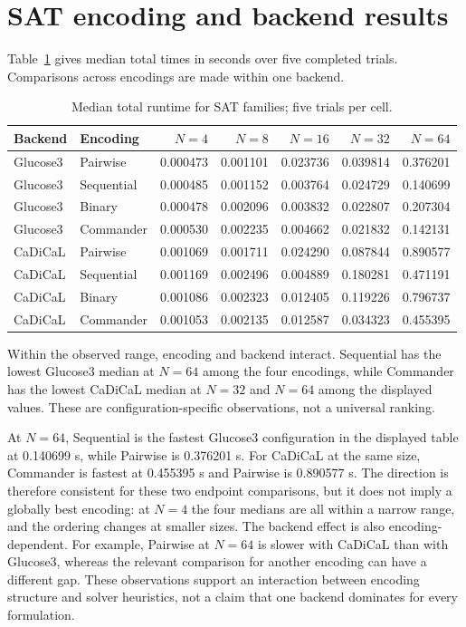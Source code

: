 \documentclass[a4paper,fleqn]{cas-sc}
\begin{document}
\section{SAT encoding and backend results}
Table~\ref{tab:sat-runtime} gives median total times in seconds over five
completed trials. Comparisons across encodings are made within one backend.

\begin{table}[H]
\centering
\caption{Median total runtime for SAT families; five trials per cell.}
\label{tab:sat-runtime}
\scriptsize
\begin{tabular}{llrrrrr}
\toprule
Backend & Encoding & $N=4$ & $N=8$ & $N=16$ & $N=32$ & $N=64$\\
\midrule
Glucose3 & Pairwise & 0.000473 & 0.001101 & 0.023736 & 0.039814 & 0.376201\\
Glucose3 & Sequential & 0.000485 & 0.001152 & 0.003764 & 0.024729 & 0.140699\\
Glucose3 & Binary & 0.000478 & 0.002096 & 0.003832 & 0.022807 & 0.207304\\
Glucose3 & Commander & 0.000530 & 0.002235 & 0.004662 & 0.021832 & 0.142131\\
CaDiCaL & Pairwise & 0.001069 & 0.001711 & 0.024290 & 0.087844 & 0.890577\\
CaDiCaL & Sequential & 0.001169 & 0.002496 & 0.004889 & 0.180281 & 0.471191\\
CaDiCaL & Binary & 0.001086 & 0.002323 & 0.012405 & 0.119226 & 0.796737\\
CaDiCaL & Commander & 0.001053 & 0.002135 & 0.012587 & 0.034323 & 0.455395\\
\bottomrule
\end{tabular}
\end{table}

Within the observed range, encoding and backend interact. Sequential has the
lowest Glucose3 median at $N=64$ among the four encodings, while Commander has
the lowest CaDiCaL median at $N=32$ and $N=64$ among the displayed values.
These are configuration-specific observations, not a universal ranking.

At $N=64$, Sequential is the fastest Glucose3 configuration in the displayed
table at 0.140699 s, while Pairwise is 0.376201 s. For CaDiCaL at the same
size, Commander is fastest at 0.455395 s and Pairwise is 0.890577 s. The
direction is therefore consistent for these two endpoint comparisons, but it
does not imply a globally best encoding: at $N=4$ the four medians are all
within a narrow range, and the ordering changes at smaller sizes. The backend
effect is also encoding-dependent. For example, Pairwise at $N=64$ is slower
with CaDiCaL than with Glucose3, whereas the relevant comparison for another
encoding can have a different gap. These observations support an interaction
between encoding structure and solver heuristics, not a claim that one backend
dominates for every formulation.
\end{document}
